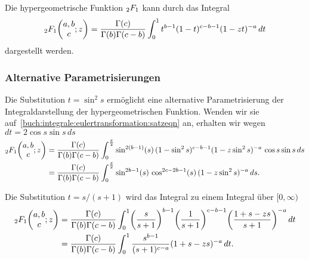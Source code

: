 \begin{satz}[Euler]
%
\label{buch:integrale:eulertransformation:satz}
Die hypergeometrische Funktion $\mathstrut_2F_1$ kann durch das 
Integral
\begin{equation}
\mathstrut_2F_1\biggl(\begin{matrix}a,b\\c\end{matrix};z\biggr)
=
\frac{\Gamma(c)}{\Gamma(b)\Gamma(c-b)}
\int_0^1
t^{b-1}(1-t)^{c-b-1}(1-zt)^{-a}
\,dt
\label{buch:integrale:eulertransformation:satzeqn}
\end{equation}
dargestellt werden.
\end{satz}

%
%
\subsubsection{Alternative Parametrisierungen}
Die Substitution $t=\sin^2 s$ ermöglicht eine alternative Parametrisierung
der Integraldarstellung der hypergeometrischen Funktion.
Wenden wir sie auf~\eqref{buch:integrale:eulertransformation:satzeqn}
an, erhalten wir wegen $dt = 2\cos s\sin s\,ds$
\begin{align*}
\mathstrut_2F_1\biggl(\begin{matrix}a,b\\c\end{matrix};z\biggr)
&=
\frac{\Gamma(c)}{\Gamma(b)\Gamma(c-b)}
\int_0^{\frac{\pi}2}
\sin^{2(b-1)}(s)\,
(1-\sin^2s)^{c-b-1} (1-z\sin^2 s)^{-a}
\,\cos s\sin s
\,ds
\\
&=
\frac{\Gamma(c)}{\Gamma(b)\Gamma(c-b)}
\int_0^{\frac{\pi}2}
\sin^{2b-1}(s)\,\cos^{2c-2b-1}(s)\, (1-z\sin^2 s)^{-a}
\,ds.
\end{align*}

Die Substitution $t=s/(s+1)$ wird das Integral zu einem Integral
über $[0,\infty)$
\begin{align*}
\mathstrut_2F_1\biggl(\begin{matrix}a,b\\c\end{matrix};z\biggr)
&=
\frac{\Gamma(c)}{\Gamma(b)\Gamma(c-b)}
\int_0^1
\biggl(\frac{s}{s+1}\biggr)^{b-1}
\biggl(\frac{1}{s+1}\biggr)^{c-b-1}
\biggl(\frac{1+s-zs}{s+1}\biggr)^{-a}
\,dt
\\
&=
\frac{\Gamma(c)}{\Gamma(b)\Gamma(c-b)}
\int_0^1
\frac{
s^{b-1}
}{
(s+1)^{c-a}
}
(1+s-zs)^{-a}
\,dt.
\end{align*}

